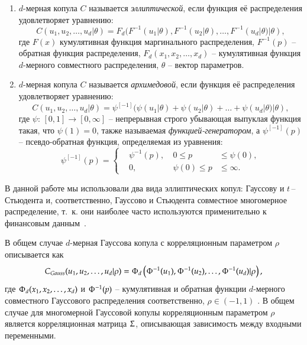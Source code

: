 \begin{enumerate}[label=(\arabic*),labelwidth=1cm,leftmargin=1cm]
\item $d$-мерная копула $C$ называется \textit{эллиптической}, если функция её распределения удовлетворяет уравнению:
\begin{equation} \label{EllipCop}
    C(u_1, u_2, \ldots,u_d|\theta) = F_d(F^{-1}(u_1|\theta),F^{-1}(u_2|\theta), \ldots,F^{-1}(u_d|\theta)|\theta),
\end{equation}
где $F(x)$ кумулятивная функция маргинального распределения, $F^{-1}(p)$ -- обратная функция распределения, $F_d(x_1,x_2,\dots,x_d)$ -- кумулятивная функция $d$-мерного совместного распределения, $\theta$ -- вектор параметров.

\item $d$-мерная копула $C$ называется \textit{архимедовой}, если функция её распределения удовлетворяет уравнению:
\begin{equation} \label{ArchCop}
    C(u_1,u_2,\ldots,u_d|\theta) = \psi^{[-1]}(\psi(u_1|\theta)+\psi(u_2|\theta) + \ldots + \psi(u_d|\theta) | \theta ),
\end{equation}
где $\psi$: $[0,1] \rightarrow [0, \infty]$ -- непрерывная строго убывающая выпуклая функция такая, что $\psi(1)=0$, также называемая \textit{функцией-генератором}, а $\psi^{[-1]}(p)$ -- псевдо-обратная функция, определяемая из уравнения:
$$\psi^{[-1]}(p) = \left\{ \begin{aligned}
    & \psi^{-1}(p),    & \ 0 \le p & \le \psi(0), \\
    & 0,                  & \ \psi(0) \le p & \le \infty.
\end{aligned} \right.$$
\end{enumerate}

В данной работе мы использовали два вида эллиптических копул: Гауссову и $t$\,--\,Стьюдента и, соответственно, Гауссово и Стьюдента совместное многомерное распределение, т.~к. они наиболее часто используются применительно к финансовым данным~\cite{Lourme2016}.

В общем случае $d$-мерная Гауссова копула с корреляционным параметром $\rho$ описывается как
\begin{equation} \label{nCop}
C_{Gauss}(u_1,u_2,\ldots,u_d|\rho) = \Upphi_d \left( \Upphi^{-1} (u_1), \Upphi^{-1} (u_2), \ldots, \Upphi^{-1} (u_d) | \rho \right),
\end{equation}
где $\Upphi_d(x_1,x_2,\dots,x_d)$ и $\Upphi^{-1}(p)$ -- кумулятивная и обратная функции $d$-мерного совместного Гауссового распределения соответственно, $\rho \in (-1, 1)$ \cite{Emb2001}. 
В общем случае для многомерной Гауссовой копулы корреляционным параметром $\rho$ является корреляционная матрица $\Upsigma$, описывающая зависимость между входными переменными.

